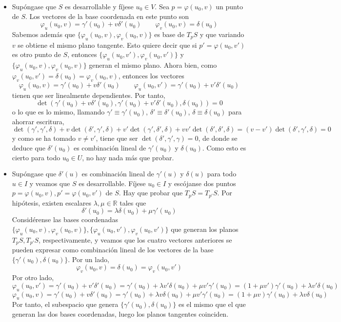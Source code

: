 \documentclass[12pt]{report}
\newcommand{\R}{\mathbb R}
\begin{document}
\begin{itemize}
    \item[{\fbox[rb]{$\Rightarrow$}}] Supóngase que $S$ es desarrollable y fíjese $u_0 \in V$. Sea $p = \varphi(u_0,v)$ un punto de $S$. Los vectores de la base coordenada en este punto son
    \[\varphi_u(u_0,v) = \gamma'(u_0)+v\delta'(u_0) \qquad \varphi_v(u_0,v) = \delta(u_0)\]
    Sabemos además que $\{\varphi_u(u_0,v),\varphi_v(u_0,v)\}$ es base de $T_pS$ y que variando $v$ se obtiene el mismo plano tangente. Esto quiere decir que si $p' = \varphi(u_0,v')$ es otro punto de $S$, entonces $\{\varphi_u(u_0,v'),\varphi_v(u_0,v')\}$ y $\{\varphi_u(u_0,v),\varphi_v(u_0,v)\}$ generan el mismo plano. Ahora bien, como $\varphi_v(u_0,v') = \delta(u_0) = \varphi_v(u_0,v)$, entonces los vectores
    \[\varphi_u(u_0,v) = \gamma'(u_0) + v\delta'(u_0) \qquad \varphi_u(u_0,v') = \gamma'(u_0) + v'\delta'(u_0)\]
    tienen que ser linealmente dependientes. Por tanto,
    \[
        \det(\gamma'(u_0) + v\delta'(u_0), \gamma'(u_0) + v'\delta'(u_0), \delta(u_0)) = 0
    \]
    o lo que es lo mismo, llamando $\gamma' \equiv \gamma'(u_0)$, $\delta' \equiv \delta'(u_0)$, $\delta \equiv \delta(u_0)$ para ahorrar escritura,
    \[\det(\gamma', \gamma', \delta) +v\det(\delta',\gamma',\delta)  + v'\det(\gamma',\delta',\delta)+vv'\det(\delta',\delta',\delta) = (v-v')\det(\delta',\gamma',\delta) = 0\]
    y como se ha tomado $v \neq v'$, tiene que ser $\det(\delta',\gamma',\gamma) = 0$, de donde se deduce que $\delta'(u_0)$ es combinación lineal de $\gamma'(u_0)$ y $\delta(u_0)$. Como esto es cierto para todo $u_0 \in U$, no hay nada más que probar.
    \item[{\fbox[rb]{$\Leftarrow$}}] Supóngase que $\delta'(u)$ es combinación lineal de $\gamma'(u)$ y $\delta(u)$ para todo $u \in I$ y veamos que $S$ es desarrollable. Fíjese $u_0 \in I$ y escójanse dos puntos $p = \varphi(u_0,v), p' = \varphi(u_0,v')$ de $S$. Hay que probar que $T_pS = T_{p'}S$. Por hipótesis, existen escalares $\lambda, \mu \in \R$ tales que
    \[\delta'(u_0) = \lambda \delta(u_0)+\mu\gamma'(u_0)\]
    Considérense las bases coordenadas $\{\varphi_u(u_0,v),\varphi_v(u_0,v)\}, \{\varphi_u(u_0,v'),\varphi_v(u_0,v')\}$ que generan los planos $T_pS, T_{p'}S$, respectivamente, y veamos que los cuatro vectores anteriores se pueden expresar como combinación lineal de los vectores de la base $\{\gamma'(u_0),\delta(u_0)\}$. Por un lado,
    \[\varphi_v(u_0,v) = \delta(u_0) = \varphi_v(u_0,v') \] 
    Por otro lado,
    \[\varphi_u(u_0,v') = \gamma'(u_0) + v'\delta'(u_0) = \gamma'(u_0)+\lambda v' \delta(u_0) + \mu v' \gamma'(u_0) = (1+\mu v')\gamma'(u_0) + \lambda v' \delta(u_0)\]
    \[\varphi_u(u_0,v) = \gamma'(u_0) + v\delta'(u_0) = \gamma'(u_0)+\lambda v \delta(u_0) + \mu v'\gamma'(u_0) = (1+\mu v)\gamma'(u_0) + \lambda v \delta(u_0)\]
    Por tanto, el subespacio que genera $\{\gamma'(u_0),\delta(u_0)\}$ es el mismo que el que generan las dos bases coordenadas, luego los planos tangentes coinciden.
\end{itemize}
\end{document}
